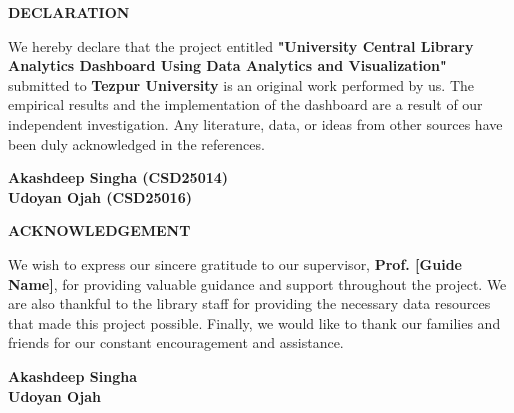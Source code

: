 \documentclass[12pt,a4paper]{report}
\begin{document}
\newpage
\begin{center}
    {\Large \textbf{DECLARATION}\par}
\end{center}
\vspace{1cm}
We hereby declare that the project entitled \textbf{"University Central Library Analytics Dashboard Using Data Analytics and Visualization"} submitted to \textbf{Tezpur University} is an original work performed by us. The empirical results and the implementation of the dashboard are a result of our independent investigation. Any literature, data, or ideas from other sources have been duly acknowledged in the references.
\vspace{2cm}
\begin{flushright}
    \textbf{Akashdeep Singha (CSD25014)} \\
    \textbf{Udoyan Ojah (CSD25016)}
\end{flushright}

\newpage
\begin{center}
    {\Large \textbf{ACKNOWLEDGEMENT}\par}
\end{center}
\vspace{1cm}
We wish to express our sincere gratitude to our supervisor, \textbf{Prof. [Guide Name]}, for providing valuable guidance and support throughout the project. We are also thankful to the library staff for providing the necessary data resources that made this project possible. Finally, we would like to thank our families and friends for our constant encouragement and assistance.
\vspace{2cm}
\begin{flushright}
    \textbf{Akashdeep Singha} \\
    \textbf{Udoyan Ojah}
\end{flushright}
\end{document}
